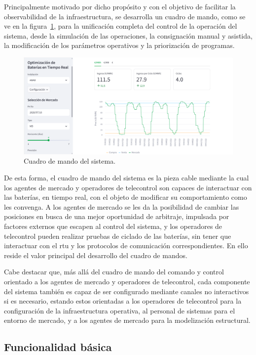 Principalmente motivado por dicho propósito y con el objetivo de facilitar la observabilidad de la infraestructura, se desarrolla un cuadro de mando, como se ve en la figura~\ref{fig:cuadro-de-mando}, para la unificación completa del control de la operación del sistema, desde la simulación de las operaciones, la consignación manual y asistida, la modificación de los parámetros operativos y la priorización de programas.

\begin{figure}
  \centering
  \includegraphics[width=0.75\linewidth]{figures/cuadro-de-mando.png}
  \caption[Cuadro de mando del sistema.]{Cuadro de mando del sistema.}
  \label{fig:cuadro-de-mando}
\end{figure}

De esta forma, el cuadro de mando del sistema es la pieza cable mediante la cual los agentes de mercado y operadores de telecontrol son capaces de interactuar con las baterías, en tiempo real, con el objeto de modificar su comportamiento como les convenga. A los agentes de mercado se les da la posibilidad de cambiar las posiciones en busca de una mejor oportunidad de arbitraje, impulsada por factores externos que escapen al control del sistema, y los operadores de telecontrol pueden realizar pruebas de ciclado de las baterías, sin tener que interactuar con el \gls{rtu} y los protocolos de comunicación correspondientes. En ello reside el valor principal del desarrollo del cuadro de mandos.

Cabe destacar que, más allá del cuadro de mando del comando y control orientado a los agentes de mercado y operadores de telecontrol, cada componente del sistema también es capaz de ser configurado mediante canales no interactivos si es necesario, estando estos orientadas a los operadores de telecontrol para la configuración de la infraestructura operativa, al personal de sistemas para el entorno de mercado, y a los agentes de mercado para la modelización estructural.

\subsection{Funcionalidad básica}
\label{makereference6.2.1}

